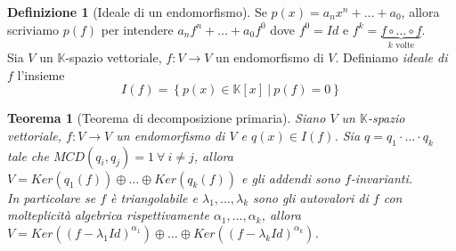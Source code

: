 \documentclass[11pt]{article}
\theoremstyle{plain}
\newtheorem{thm}{Teorema}[section]
\theoremstyle{definition}
\newtheorem{defn}{Definizione}[section]
\theoremstyle{remark}
\newcommand{\K}{\mathbb{K}}
\begin{document}
\begin{defn}[Ideale di un endomorfismo]
	Se $p(x)=a_n x^n+\ldots+a_0$, allora scriviamo $p(f)$ per intendere $a_nf^n+\ldots+a_0f^0$ dove $f^0=Id$ e $f^k=\underbrace{f\circ\ldots\circ f}_{k \text{ volte}}$.\\
	Sia $V$ un $\K$-spazio vettoriale, $f:V\to V$ un endomorfismo di $V$. Definiamo \textit{ideale di $f$} l'insieme
	\[
		I(f)=\left\{ p(x)\in \K[x]\ |\ p(f)=0 \right\}
	\]
	

\end{defn}


\begin{thm}[Teorema di decomposizione primaria]
\label{thm:dec_primaria}
	Siano $V$ un $\K$-spazio vettoriale, $f:V\to V$ un endomorfismo di $V$ e $q(x)\in I(f)$. Sia $q=q_1\cdot\ldots\cdot q_k$ tale che $MCD(q_i,q_j)=1\ \forall\ i\neq j$, allora $V=Ker(q_1(f))\oplus\dots\oplus Ker(q_k(f))$ e gli addendi sono $f$-invarianti.\\
	In particolare se $f$ è triangolabile e $\lambda_1,\ldots,\lambda_k$ sono gli autovalori di $f$ con molteplicità algebrica rispettivamente $\alpha_1,\ldots,\alpha_k$, allora $V=Ker\left((f-\lambda_1 Id)^{\alpha_1}\right)\oplus\dots\oplus Ker\left((f-\lambda_k Id)^{\alpha_k}\right)$.
\end{thm}
\end{document}

